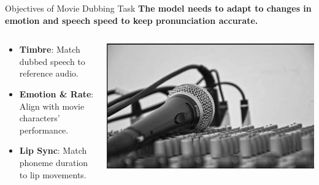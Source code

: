 \begin{frame}{Objectives of Movie Dubbing Task}
\textbf{The model needs to adapt to changes in emotion and speech speed to keep pronunciation accurate.}
\begin{columns}
    \begin{column}{0.6\textwidth}
        \begin{itemize}
                \item \textbf{Timbre}: Match dubbed speech to reference audio.
                \item \textbf{Emotion \& Rate}: Align with movie characters' performance.
                \item \textbf{Lip Sync}: Match phoneme duration to lip movements.
        \end{itemize}
    \end{column}
    \begin{column}{0.4\textwidth}
        \includegraphics[width=\textwidth]{figs/配音.png}
    \end{column}
\end{columns}
\end{frame}



